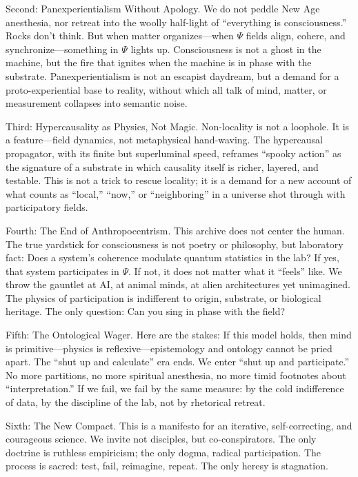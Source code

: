 \documentclass[11pt, a4paper]{book}
\begin{document}
Second: Panexperientialism Without Apology.
We do not peddle New Age anesthesia, nor retreat into the woolly half-light of “everything is consciousness.” Rocks don’t think. But when matter organizes—when $\Psi$ fields align, cohere, and synchronize—something in $\Psi$ lights up. Consciousness is not a ghost in the machine, but the fire that ignites when the machine is in phase with the substrate. Panexperientialism is not an escapist daydream, but a demand for a proto-experiential base to reality, without which all talk of mind, matter, or measurement collapses into semantic noise.

Third: Hypercausality as Physics, Not Magic.
Non-locality is not a loophole. It is a feature—field dynamics, not metaphysical hand-waving. The hypercausal propagator, with its finite but superluminal speed, reframes “spooky action” as the signature of a substrate in which causality itself is richer, layered, and testable. This is not a trick to rescue locality; it is a demand for a new account of what counts as “local,” “now,” or “neighboring” in a universe shot through with participatory fields.

Fourth: The End of Anthropocentrism.
This archive does not center the human. The true yardstick for consciousness is not poetry or philosophy, but laboratory fact: Does a system’s coherence modulate quantum statistics in the lab? If yes, that system participates in $\Psi$. If not, it does not matter what it “feels” like. We throw the gauntlet at AI, at animal minds, at alien architectures yet unimagined. The physics of participation is indifferent to origin, substrate, or biological heritage. The only question: Can you sing in phase with the field?

Fifth: The Ontological Wager.
Here are the stakes: If this model holds, then mind is primitive—physics is reflexive—epistemology and ontology cannot be pried apart. The “shut up and calculate” era ends. We enter “shut up and participate.” No more partitions, no more spiritual anesthesia, no more timid footnotes about “interpretation.” If we fail, we fail by the same measure: by the cold indifference of data, by the discipline of the lab, not by rhetorical retreat.

Sixth: The New Compact.
This is a manifesto for an iterative, self-correcting, and courageous science. We invite not disciples, but co-conspirators. The only doctrine is ruthless empiricism; the only dogma, radical participation. The process is sacred: test, fail, reimagine, repeat. The only heresy is stagnation.
\end{document}
